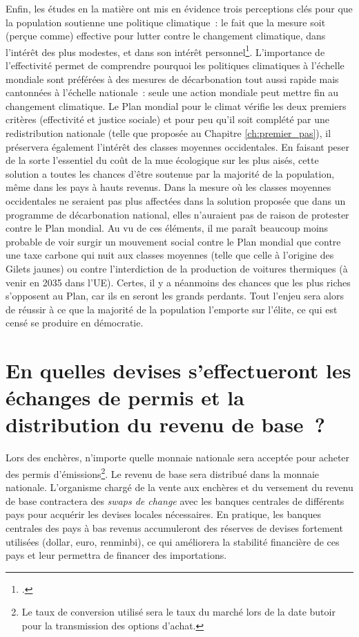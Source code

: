 \documentclass[a5paper,french,openany]{memoir}
\begin{document}
Enfin, les études en la matière ont mis en évidence trois perceptions clés pour que la population soutienne une politique climatique~: le fait que la mesure soit (perçue comme) effective pour lutter contre le changement climatique, dans l'intérêt des plus modestes, et dans son intérêt personnel\footnote{\cite{dechezlepretre_fighting_2022}.}. L'importance de l'effectivité permet de comprendre pourquoi les politiques climatiques à l'échelle mondiale sont préférées à des mesures de décarbonation tout aussi rapide mais cantonnées à l'échelle nationale~: seule une action mondiale peut mettre fin au changement climatique. Le Plan mondial pour le climat vérifie les deux premiers critères (effectivité et justice sociale) et pour peu qu'il soit complété par une redistribution nationale (telle que proposée au Chapitre \ref{ch:premier_pas}), il préservera également l'intérêt des classes moyennes occidentales. En faisant peser de la sorte l'essentiel du coût de la mue écologique sur les plus aisés, cette solution a toutes les chances d'être soutenue par la majorité de la population, même dans les pays à hauts revenus. Dans la mesure où les classes moyennes occidentales ne seraient pas plus affectées dans la solution proposée que dans un programme de décarbonation national, elles n'auraient pas de raison de protester contre le Plan mondial. Au vu de ces éléments, il me paraît beaucoup moins probable de voir surgir un mouvement social contre le Plan mondial que contre une taxe carbone qui nuit aux classes moyennes (telle que celle à l'origine des Gilets jaunes) ou contre l'interdiction de la production de voitures thermiques (à venir en 2035 dans l'UE). Certes, il y a néanmoins des chances que les plus riches s'opposent au Plan, car ils en seront les grands perdants. Tout l'enjeu sera alors de réussir à ce que la majorité de la population l'emporte sur l'élite, ce qui est censé se produire en démocratie.


\section*{\normalsize En quelles devises s'effectueront les échanges de permis et la distribution du revenu de base~?}\label{q:devise}

Lors des enchères, n'importe quelle monnaie nationale sera acceptée pour acheter des permis d'émissions\footnote{Le taux de conversion utilisé sera le taux du marché lors de la date butoir pour la transmission des options d'achat.}. Le revenu de base sera distribué dans la monnaie nationale. L'organisme chargé de la vente aux enchères et du versement du revenu de base contractera des \textit{swaps de change} avec les banques centrales de différents pays pour acquérir les devises locales nécessaires. En pratique, les banques centrales des pays à bas revenus accumuleront des réserves de devises fortement utilisées (dollar, euro, renminbi), ce qui améliorera la stabilité financière de ces pays et leur permettra de financer des importations.
\end{document}
